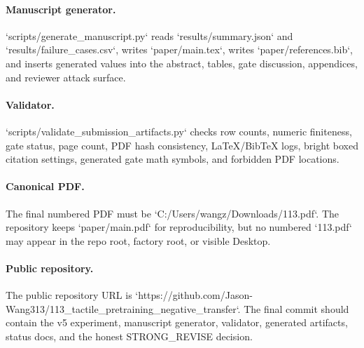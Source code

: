 \documentclass{article}
\begin{document}
\paragraph{Manuscript generator.}
`scripts/generate\_manuscript.py` reads `results/summary.json` and `results/failure\_cases.csv`, writes `paper/main.tex`, writes `paper/references.bib`, and inserts generated values into the abstract, tables, gate discussion, appendices, and reviewer attack surface.

\paragraph{Validator.}
`scripts/validate\_submission\_artifacts.py` checks row counts, numeric finiteness, gate status, page count, PDF hash consistency, LaTeX/BibTeX logs, bright boxed citation settings, generated gate math symbols, and forbidden PDF locations.

\paragraph{Canonical PDF.}
The final numbered PDF must be `C:/Users/wangz/Downloads/113.pdf`. The repository keeps `paper/main.pdf` for reproducibility, but no numbered `113.pdf` may appear in the repo root, factory root, or visible Desktop.

\paragraph{Public repository.}
The public repository URL is `https://github.com/Jason-Wang313/113\_tactile\_pretraining\_negative\_transfer`. The final commit should contain the v5 experiment, manuscript generator, validator, generated artifacts, status docs, and the honest STRONG\_REVISE decision.

\begingroup
\raggedright


\endgroup
\end{document}
